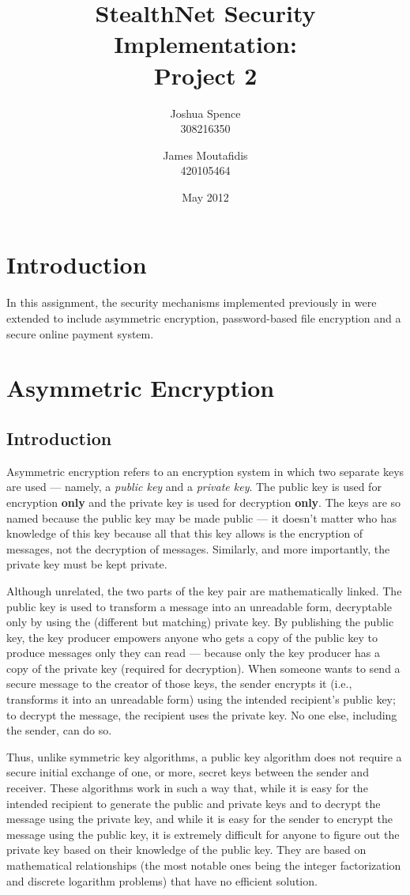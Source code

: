 \documentclass[a4paper,11pt]{article}
\title{StealthNet Security Implementation: \\ Project 2}
\author{Joshua Spence \\ 308216350 \and James Moutafidis \\ 420105464}
\date{May 2012}
\begin{document}
\maketitle

\section{Introduction}
In this assignment, the security mechanisms implemented previously in
\packageName{} were extended to include asymmetric encryption, password-based
file encryption and a secure online payment system.

\section{Asymmetric Encryption}

\subsection{Introduction}
Asymmetric encryption refers to an encryption system in which two separate keys
are used --- namely, a \emph{public key} and a \emph{private key}. The public
key is used for encryption \textbf{only} and the private key is used for
decryption \textbf{only}. The keys are so named because the public key may be
made public --- it doesn't matter who has knowledge of this key because all that
this key allows is the encryption of messages, not the decryption of messages.
Similarly, and more importantly, the private key must be kept private.

Although unrelated, the two parts of the key pair are mathematically linked. The
public key is used to transform a message into an unreadable form, decryptable
only by using the (different but matching) private key. By publishing the public
key, the key producer empowers anyone who gets a copy of the public key to
produce messages only they can read --- because only the key producer has a copy
of the private key (required for decryption). When someone wants to send a
secure message to the creator of those keys, the sender encrypts it (i.e.,
transforms it into an unreadable form) using the intended recipient's public
key; to decrypt the message, the recipient uses the private key. No one else,
including the sender, can do so.

Thus, unlike symmetric key algorithms, a public key algorithm does not require a
secure initial exchange of one, or more, secret keys between the sender and
receiver. These algorithms work in such a way that, while it is easy for the
intended recipient to generate the public and private keys and to decrypt the
message using the private key, and while it is easy for the sender to encrypt
the message using the public key, it is extremely difficult for anyone to figure
out the private key based on their knowledge of the public key. They are based
on mathematical relationships (the most notable ones being the integer
factorization and discrete logarithm problems) that have no efficient solution.
\end{document}
